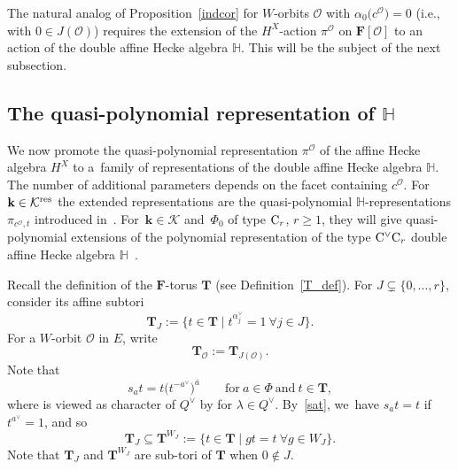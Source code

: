 The natural analog of Proposition~\ref{indcor} for $W$-orbits $\mathcal{O}$ with $\alpha_0\bigl(c^\mathcal{O}\bigr)=0$ (i.e., with $0\in J(\mathcal{O})$) requires the extension of the $H^X$-action $\pi^\mathcal{O}$ on $\mathbf{F}[\mathcal{O}]$ to an action of the double affine Hecke algebra $\mathbb{H}$. This will be the subject of the next subsection.

\subsection[The quasi-polynomial representation of H]{The quasi-polynomial representation of $\boldsymbol{\mathbb{H}}$}\label{wtsection}
We now promote the quasi-polynomial representation $\pi^\mathcal{O}$ of the affine Hecke algebra $H^X$ to a~family of representations of the double affine Hecke algebra $\mathbb{H}$.
The number of additional parameters
depends on the facet  containing $c^\mathcal{O}$.
For $\mathbf{k}\in\mathcal{K}^{{\rm res}}$ the extended representations are the quasi-polynomial $\mathbb{H}$-representations $\pi_{c^\mathcal{O},t}$ introduced in~\cite[Theorem~1.1]{SSV2}. For~${\mathbf{k}\in\mathcal{K}}$ and~$\Phi_0$ of type ${\rm C}_r$, $r\geq 1$, they will give quasi-polynomial extensions of the polynomial representation of the
type ${\rm C}^\vee{\rm C}_r$ double affine Hecke algebra $\mathbb{H}$~\cite{No,Sa}.

Recall the definition of the $\mathbf{F}$-torus $\mathbf{T}$ (see Definition~\ref{T_def}). For $J\subsetneq\{0,\dots,r\}$, consider its affine subtori
\begin{equation*}
\mathbf{T}_J:=\bigl\{t\in\mathbf{T}\mid t^{\alpha_j^\vee}=1\ \forall j\in J\bigr\}.
\end{equation*}
For a $W$-orbit $\mathcal{O}$ in $E$, write
\[\mathbf{T}_\mathcal{O}:=\mathbf{T}_{J(\mathcal{O})}.
\]
Note that
\begin{equation}\label{sat}
s_at=t\bigl(t^{-a^\vee}\bigr)^{\overline{a}}\qquad \text{for}\ a\in\Phi\ \text{and}\ t\in\mathbf{T},
\end{equation}
where  is viewed as character of $Q^\vee$ by  for
$\lambda\in Q^\vee$. By~\eqref{sat}, we~have
$s_at=t$ if $t^{a^\vee}=1$, and so
\begin{equation}\label{containedinv}
\mathbf{T}_J\subseteq\mathbf{T}^{W_J}:=\{t\in\mathbf{T} \mid gt=t\ \forall g\in W_J\}.
\end{equation}
Note that $\mathbf{T}_J$ and $\mathbf{T}^{W_J}$ are sub-tori of $\mathbf{T}$ when $0\not\in J$.

